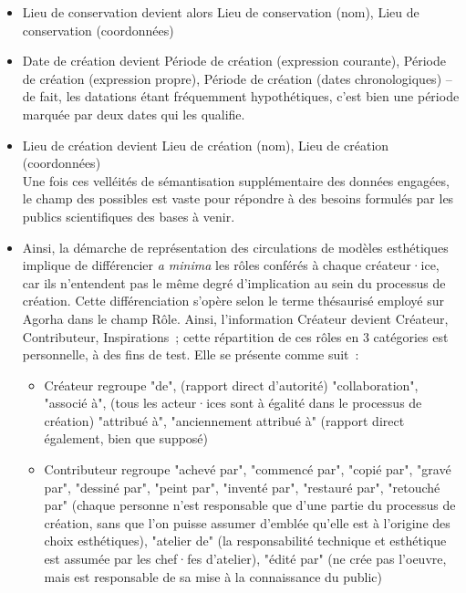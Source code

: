 \documentclass[a4paper,12pt, twoside]{book}
\begin{document}
\begin{itemize}
    \item \textsf{Lieu de conservation} devient alors \textsf{Lieu de conservation (nom), Lieu de conservation (coordonnées)}\\

    \item \textsf{Date de création} devient \textsf{Période de création (expression courante), Période de création (expression propre), Période de création (dates chronologiques)} – de fait, les datations étant fréquemment hypothétiques, c’est bien une période marquée par deux dates qui les qualifie.\\

    \item \textsf{Lieu de création} devient \textsf{Lieu de création (nom), Lieu de création (coordonnées)}\\
Une fois ces velléités de sémantisation supplémentaire des données engagées, le champ des possibles est vaste pour répondre à des besoins formulés par les publics scientifiques des bases à venir.\\

    \item Ainsi, la démarche de représentation des circulations de modèles esthétiques implique de différencier \textit{a minima} les rôles conférés à chaque créateur·ice, car ils n’entendent pas le même degré d’implication au sein du processus de création. Cette différenciation s’opère selon le terme thésaurisé employé sur Agorha dans le champ \textsf{Rôle}. Ainsi, l’information \textsf{Créateur} devient \textsf{Créateur, Contributeur, Inspirations}~; cette répartition de ces rôles en 3 catégories est personnelle, à des fins de test. Elle se présente comme suit~:\\

    \begin{itemize}
        \item \textsf{Créateur} regroupe \textsf{"de"}, (rapport direct d’autorité) \textsf{"collaboration", "associé à"}, (tous les acteur·ices sont à égalité dans le processus de création) \textsf{"attribué à", "anciennement attribué à"} (rapport direct également, bien que supposé)\\

        \item \textsf{Contributeur} regroupe \textsf{"achevé par", "commencé par", "copié par", "gravé par", "dessiné par", "peint par", "inventé par", "restauré par", "retouché par"} (chaque personne n’est responsable que d’une partie du processus de création, sans que l’on puisse assumer d’emblée qu’elle est à l’origine des choix esthétiques), \textsf{"atelier de"} (la responsabilité technique et esthétique est assumée par les chef·fes d’atelier), \textsf{"édité par"} (ne crée pas l’oeuvre, mais est responsable de sa mise à la connaissance du public)\\


\end{itemize}
\end{itemize}
\end{document}
